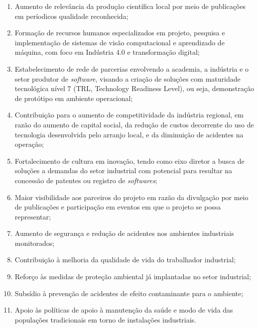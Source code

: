 \begin{enumerate}
    \item Aumento de relevância da produção científica local por meio de publicações em períodicos qualidade reconhecida;
    \item Formação de recursos humanos especializados em projeto, pesquisa e implementação de sistemas de visão computacional e aprendizado de máquina, com foco em Indústria 4.0 e transformação digital; 
    \item Estabelecimento de rede de parcerias envolvendo a academia, a indústria e o setor produtor de \emph{software}, visando a criação de soluções com maturidade tecnológica nível 7 (TRL, Technology Readiness Level), ou seja, demonstração de protótipo em ambiente operacional; %
    \item Contribuição para o aumento de competitividade da indústria regional, em razão do aumento de capital social, da redução de custos decorrente do uso de tecnologia desenvolvida pelo arranjo local, e da diminuição de acidentes na operação;  
    \item Fortalecimento de cultura em inovação, tendo como eixo diretor a busca de soluções a demandas do setor industrial com potencial para resultar na concessão de patentes ou registro de \emph{softwares};
    \item Maior visibilidade aos parceiros do projeto em razão da divulgação por meio de publicações e participação em eventos em que o projeto se possa representar; 
    \item Aumento de segurança e redução de acidentes nos ambientes industriais monitorados;
    \item Contribuição à melhoria da qualidade de vida do trabalhador industrial;   
    \item Reforço às medidas de proteção ambiental já implantadas no setor industrial;
    \item Subsídio à prevenção de acidentes de efeito contaminante para o ambiente;
    \item Apoio às políticas de apoio à manutenção da saúde e modo de vida das populações tradicionais em torno de instalações industriais.
\end{enumerate}
